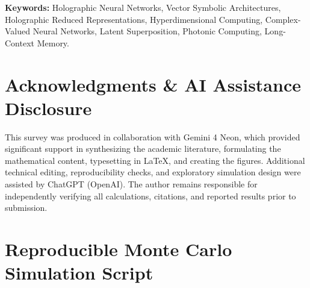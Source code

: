 \documentclass[11pt,a4paper]{article}
\theoremstyle{plain}
\theoremstyle{definition}
\theoremstyle{remark}
\begin{document}
\noindent\textbf{Keywords:} Holographic Neural Networks, Vector Symbolic Architectures, Holographic Reduced Representations, Hyperdimensional Computing, Complex-Valued Neural Networks, Latent Superposition, Photonic Computing, Long-Context Memory.

\tableofcontents
\newpage









\section*{Acknowledgments \& AI Assistance Disclosure}
{}

This survey was produced in collaboration with Gemini 4 Neon, which provided significant support in synthesizing the academic literature, formulating the mathematical content, typesetting in LaTeX, and creating the figures. Additional technical editing, reproducibility checks, and exploratory simulation design were assisted by ChatGPT (OpenAI). The author remains responsible for independently verifying all calculations, citations, and reported results prior to submission.



\clearpage
\appendix
\section{Reproducible Monte Carlo Simulation Script}\label{app:simulation}
\end{document}
